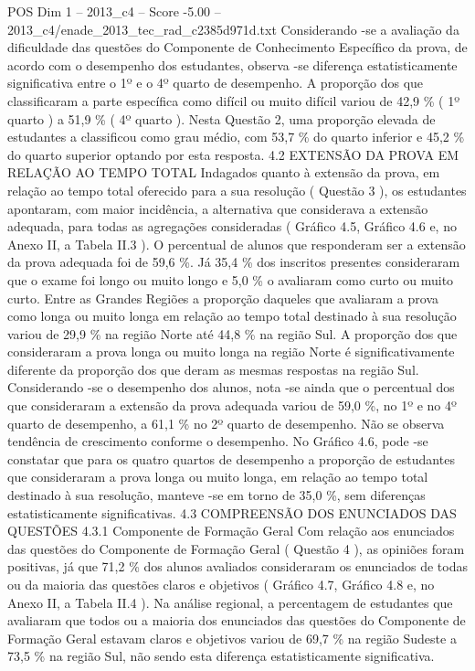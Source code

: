 \begin{textsample}{POS Dim 1 – 2013\_c4 – Score -5.00 – 2013\_c4/enade\_2013\_tec\_rad\_c2385d971d.txt}
Considerando -se a avaliação da dificuldade das questões do Componente de Conhecimento Específico da prova, de acordo com o desempenho dos estudantes, observa -se diferença estatisticamente significativa entre o 1º e o 4º quarto de desempenho.
A proporção dos que classificaram a parte específica como difícil ou muito difícil variou de 42,9 \% ( 1º quarto ) a 51,9 \% ( 4º quarto ).
Nesta Questão 2, uma proporção elevada de estudantes a classificou como grau médio, com 53,7 \% do quarto inferior e 45,2 \% do quarto superior optando por esta resposta. 4.2 EXTENSÃO DA PROVA EM RELAÇÃO AO TEMPO TOTAL Indagados quanto à extensão da prova, em relação ao tempo total oferecido para a sua resolução ( Questão 3 ), os estudantes apontaram, com maior incidência, a alternativa que considerava a extensão adequada, para todas as agregações consideradas ( Gráfico 4.5, Gráfico 4.6 e, no Anexo II, a Tabela II.3 ).
O percentual de alunos que responderam ser a extensão da prova adequada foi de 59,6 \%.
Já 35,4 \% dos inscritos presentes consideraram que o exame foi longo ou muito longo e 5,0 \% o avaliaram como curto ou muito curto.
Entre as Grandes Regiões a proporção daqueles que avaliaram a prova como longa ou muito longa em relação ao tempo total destinado à sua resolução variou de 29,9 \% na região Norte até 44,8 \% na região Sul.
A proporção dos que consideraram a prova longa ou muito longa na região Norte é significativamente diferente da proporção dos que deram as mesmas respostas na região Sul.
Considerando -se o desempenho dos alunos, nota -se ainda que o percentual dos que consideraram a extensão da prova adequada variou de 59,0 \%, no 1º e no 4º quarto de desempenho, a 61,1 \% no 2º quarto de desempenho.
Não se observa tendência de crescimento conforme o desempenho.
No Gráfico 4.6, pode -se constatar que para os quatro quartos de desempenho a proporção de estudantes que consideraram a prova longa ou muito longa, em relação ao tempo total destinado à sua resolução, manteve -se em torno de 35,0 \%, sem diferenças estatisticamente significativas. 4.3 COMPREENSÃO DOS ENUNCIADOS DAS QUESTÕES 4.3.1 Componente de Formação Geral Com relação aos enunciados das questões do Componente de Formação Geral ( Questão 4 ), as opiniões foram positivas, já que 71,2 \% dos alunos avaliados consideraram os enunciados de todas ou da maioria das questões claros e objetivos ( Gráfico 4.7, Gráfico 4.8 e, no Anexo II, a Tabela II.4 ).
Na análise regional, a percentagem de estudantes que avaliaram que todos ou a maioria dos enunciados das questões do Componente de Formação Geral estavam claros e objetivos variou de 69,7 \% na região Sudeste a 73,5 \% na região Sul, não sendo esta diferença estatisticamente significativa.

\end{textsample}
